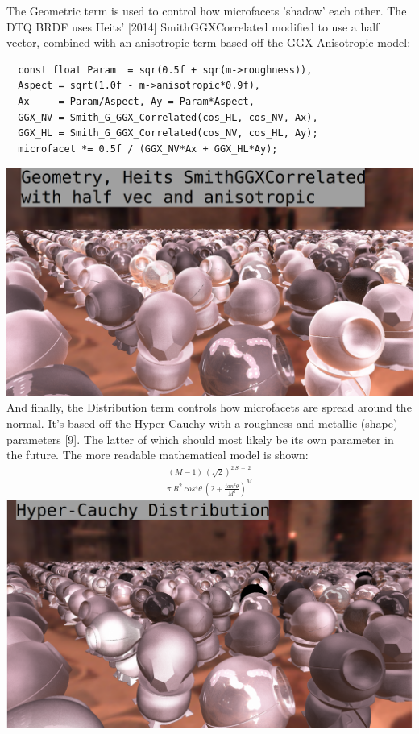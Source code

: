 \message{ !name(test.tex)}\documentclass{article}
\begin{document}
  The Geometric term is used to control how microfacets 'shadow' each other. The
DTQ BRDF uses Heits' [2014] SmithGGXCorrelated modified to use a half vector,
combined with an anisotropic term based off the GGX Anisotropic model:
  \begin{lstlisting}
  const float Param  = sqr(0.5f + sqr(m->roughness)),
  Aspect = sqrt(1.0f - m->anisotropic*0.9f),
  Ax     = Param/Aspect, Ay = Param*Aspect,
  GGX_NV = Smith_G_GGX_Correlated(cos_HL, cos_NV, Ax),
  GGX_HL = Smith_G_GGX_Correlated(cos_NV, cos_HL, Ay);
  microfacet *= 0.5f / (GGX_NV*Ax + GGX_HL*Ay);
  \end{lstlisting}
  \includegraphics[scale=0.20]{geometric}
  And finally, the Distribution term controls how microfacets are spread around
the normal. It's based off the Hyper Cauchy with a roughness and metallic
(shape) parameters [9]. The latter of which should most likely be its own
parameter in the future. The more readable mathematical model is shown:
  \begin{align}
  \frac{(M - 1)\:(\sqrt{2})^{2\:S\:-\:2}}
  	    {\pi\:R^{2}\:cos^{4}\theta\:(2 +
  	      \frac{tan^{2}\theta}{M^2})^M}
  \end{align}
  \includegraphics[scale=0.20]{distribution}
  
\end{document}
